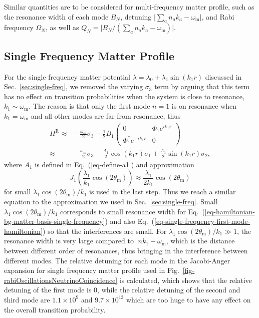 \documentclass[%
reprint,
 amsmath,amssymb,
 aps,
]{revtex4-1}
\begin{document}
Similar quantities are to be considered for multi-frequency matter profile, such as the resonance width of each mode $B_N$, detuning $\lvert \sum_a n_a k_a - \omega_{\mathrm{m}} \rvert$, and Rabi frequency $\Omega_N$, as well as $Q_N =\lvert B_N/( \sum_a n_a k_a - \omega_{\mathrm{m}}  )\rvert$. 




\subsection{Single Frequency Matter Profile}

For the single frequency matter potential $\lambda = \lambda_0 + \lambda_1 \sin(k_1 r)$ discussed in Sec.~\ref{sec:single-freq}, we removed the varying $\sigma_3$ term by arguing that this term has no effect on transition probabilities when the system is close to resonance, $k_1 \sim \omega_{\mathrm m}$. The reason is that only the first mode $n=1$ is on resonance when $k_1=\omega_{\mathrm m}$ and all other modes are far from resonance, thus
\begin{align}
H^{\mathrm R} \approx & -\frac{\omega_{\mathrm m}}{2}\sigma_3 - \frac{1}{2} B_1 \begin{pmatrix}
0 & \Phi_1 e^{i k_1 r} \\
\Phi_1^* e^{-ik_1r} & 0
\end{pmatrix}\label{eq-single-frequency-first-mode-hamiltonian} \\
\approx & -\frac{\omega_{\mathrm m}}{2} \sigma_3 - \frac{A_1}{2} \cos(k_1 r) \sigma_1 + \frac{A_1}{2} \sin(k_1 r) \sigma_2\nonumber,
\end{align}
where $A_1$ is defined in Eq.~(\ref{eq-define-a1}) and approximation
\begin{equation*}
J_1\left( \frac{\lambda_1}{k_1}\cos (2\theta_{\mathrm m}) \right) \approx \frac{\lambda_1}{2k_1}\cos (2\theta_{\mathrm m})
\end{equation*}
for small $\lambda_1\cos(2\theta_{\mathrm m})/k_1$ is used in the last step. Thus we reach a similar equation to the approximation we used in Sec.~\ref{sec:single-freq}. Small $\lambda_1\cos(2\theta_{\mathrm m})/k_1$ corresponds to small resonance width for Eq.~(\ref{eq-hamiltonian-bg-matter-basis-single-frequency}) and also Eq.~(\ref{eq-single-frequency-first-mode-hamiltonian}) so that the interferences are small. For $\lambda_1 \cos(2\theta_{\mathrm{m}})/k_1\gg 1$, the resonance width is very large compared to $\lvert n k_1 - \omega_{\mathrm{m}}$, which is the distance between different order of resonances, thus bringing in the interference between different modes. The relative detuning for each mode in the Jacobi-Anger expansion for single frequency matter profile used in Fig.~\ref{fig-rabiOscillationsNeutrinoCoincidence} is calculated, which shows that the relative detuning of the first mode is $0$, while the relative detuning of the second and third mode are $1.1\times 10^9$ and $9.7\times 10^{13}$ which are too huge to have any effect on the overall transition probability.
\end{document}
